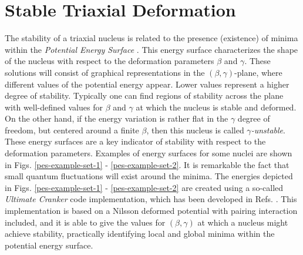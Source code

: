 \section{Stable Triaxial Deformation}
\label{potential-energy-surfaces-section}

The stability of a triaxial nucleus is related to the presence (existence) of minima within the \emph{Potential Energy Surface} \cite{ring2004nuclear}. This energy surface characterizes the shape of the nucleus with respect to the deformation parameters $\beta$ and $\gamma$. 
These solutions will consist of graphical representations in the $(\beta,\gamma)$-plane, where different values of the potential energy appear. Lower values represent a higher degree of stability. Typically one can find regions of stability across the plane with well-defined values for $\beta$ and $\gamma$ at which the nucleus is stable and deformed. On the other hand, if the energy variation is rather flat in the $\gamma$ degree of freedom, but centered around a finite $\beta$, then this nucleus is called \emph{$\gamma$-unstable}. These energy surfaces are a key indicator of stability with respect to the deformation parameters. Examples of energy surfaces for some nuclei are shown in Figs. \ref{pes-example-set-1} - \ref{pes-example-set-2}. It is remarkable the fact that small quantum fluctuations will exist around the minima. The energies depicted in Figs. \ref{pes-example-set-1} - \ref{pes-example-set-2} are created using a so-called \emph{Ultimate Cranker} code implementation, which has been developed in Refs. \cite{bengtsson1989method,bengtsson1990high}. This implementation is based on a Nilsson deformed potential with pairing interaction included, and it is able to give the values for $(\beta,\gamma)$ at which a nucleus might achieve stability, practically identifying local and global minima within the potential energy surface.

